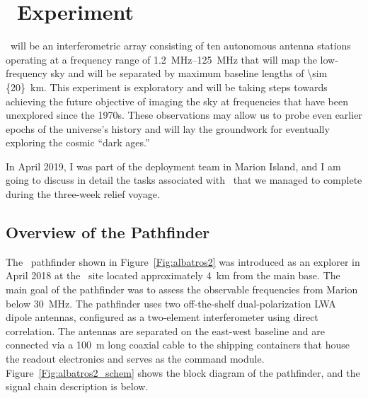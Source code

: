 \chapter{\albatros~Experiment}

\albatros\ will be an interferometric array consisting of ten autonomous antenna stations operating at a frequency range of \SIrange{1.2}{125}{\mega\hertz} that will map the low-frequency sky and will be separated by maximum baseline lengths of \SI{\sim {20}}{km}. This experiment is exploratory and will be taking steps towards achieving the future objective of imaging the sky at frequencies that have been unexplored since the 1970s. These observations may allow us to probe even earlier epochs of the universe's history and will lay the groundwork for eventually exploring the cosmic ``dark ages.''

In April 2019, I was part of the deployment team in Marion Island, and I am going to discuss in detail the tasks associated with \albatros\ that we managed to complete during the three-week relief voyage.  

\section{Overview of the Pathfinder}\label{s:pathfinder}

The \albatros\ pathfinder shown in Figure~\ref{Fig:albatros2} was introduced as an explorer in April 2018 at the \prizm\ site located approximately \SI{4}{\kilo \meter} from the main base. The main goal of the pathfinder was to assess the observable frequencies from Marion below 30~MHz. The pathfinder uses two off-the-shelf dual-polarization LWA dipole antennas, configured as a two-element interferometer using direct correlation. The antennas are separated on the east-west baseline and are connected via a \SI{100}{\meter} long coaxial cable to the shipping containers that house the readout electronics and serves as the command module. Figure~\ref{Fig:albatros2_schem} shows the block diagram of the pathfinder, and the signal chain description is below.

